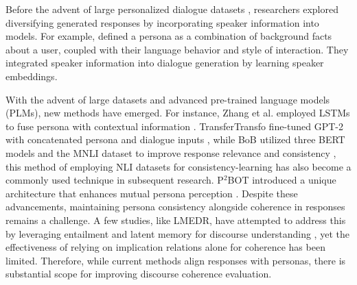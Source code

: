 \documentclass[letterpaper]{article} %
\begin{document}
Before the advent of large personalized dialogue datasets \cite{zhang-etal-2018-personalizing}, researchers explored diversifying generated responses by incorporating speaker information into models. For example, \cite{li-etal-2016-persona,alrfou-etal-2016-conversational} defined a persona as a combination of background facts about a user, coupled with their language behavior and style of interaction. They integrated speaker information into dialogue generation by learning speaker embeddings.

With the advent of large datasets and advanced pre-trained language models (PLMs), new methods have emerged. For instance, Zhang et al. employed LSTMs to fuse persona with contextual information \cite{zhang-etal-2018-personalizing}. TransferTransfo fine-tuned GPT-2 with concatenated persona and dialogue inputs \cite{wolf-etal-2019-trans}, while BoB utilized three BERT models and the MNLI dataset to improve response relevance and consistency \cite{song-etal-2021-bob, williams-etal-2018-broad}, this method of employing NLI datasets for consistency-learning has also become a commonly used technique in subsequent research. P$^2$BOT introduced a unique architecture that enhances mutual persona perception \cite{liu-etal-2020-impress}. Despite these advancements, maintaining persona consistency alongside coherence in responses remains a challenge. A few studies, like LMEDR, have attempted to address this by leveraging entailment and latent memory for discourse understanding \cite{chen-etal-2023-memorize}, yet the effectiveness of relying on implication relations alone for coherence has been limited. Therefore, while current methods align responses with personas, there is substantial scope for improving discourse coherence evaluation.

\end{document}
